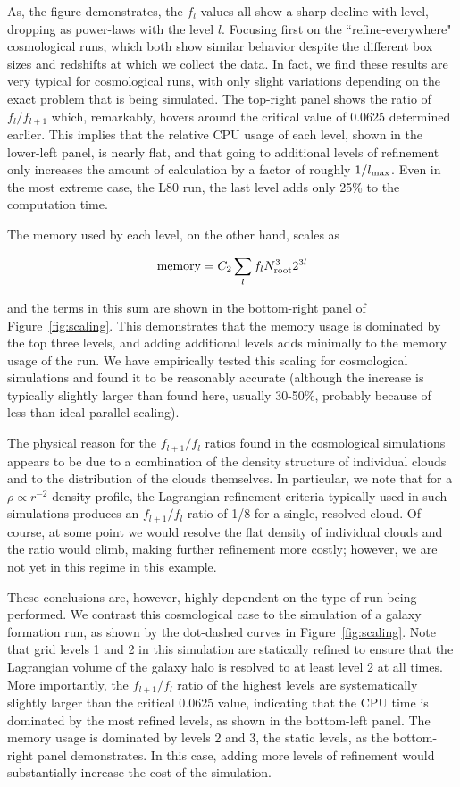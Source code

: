 As, the figure demonstrates, the $f_l$ values all show a sharp decline
with level, dropping as power-laws with the level $l$.  Focusing first
on the ``refine-everywhere" cosmological runs, which both show similar
behavior despite the different box sizes and redshifts at which we
collect the data.  In fact, we find these results are very typical for
cosmological runs, with only slight variations depending on the exact
problem that is being simulated.  The top-right panel shows the ratio
of $f_{l}/f_{l+1}$ which, remarkably, hovers around the critical value
of 0.0625 determined earlier.  This implies that the relative CPU
usage of each level, shown in the lower-left panel, is nearly flat,
and that going to additional levels of refinement only increases the
amount of calculation by a factor of roughly $1/l_{\rm max}$.  Even in
the most extreme case, the L80 run, the last level adds only 25\% to
the computation time.

The memory used by each level, on the other hand, scales as

\begin{equation}
{\rm memory} = C_2 \sum_l f_l N_{\rm root}^3 2^{3l}
\end{equation}

and the terms in this sum are shown in the bottom-right panel of
Figure~\ref{fig:scaling}.  This demonstrates that the memory usage is
dominated by the top three levels, and adding additional levels 
adds minimally to the memory usage of the run.  We have empirically
tested this scaling for cosmological simulations and found it to be
reasonably accurate (although the increase is typically slightly
larger than found here, usually 30-50\%, probably because of
less-than-ideal parallel scaling).

The physical reason for the $f_{l+1}/f_l$ ratios found in the
cosmological simulations appears to be due to a combination of the
density structure of individual clouds and to the distribution of the
clouds themselves.  In particular, we note that for a $\rho \propto
r^{-2}$ density profile, the Lagrangian refinement criteria typically
used in such simulations produces an $f_{l+1}/f_l$ ratio of 1/8 for a
single, resolved cloud.  Of course, at some point we would resolve the
flat density of individual clouds and the ratio would climb, making
further refinement more costly; however, we are not yet in this regime
in this example.

These conclusions are, however, highly dependent on the type of run
being performed.  We contrast this cosmological case to the simulation
of a galaxy formation run, as shown by the dot-dashed curves in
Figure~\ref{fig:scaling}.  Note that grid levels 1 and 2 in this
simulation are statically refined to ensure that the Lagrangian volume
of the galaxy halo is resolved to at least level 2 at all times. More
importantly, the $f_{l+1}/f_{l}$ ratio of the highest levels are
systematically slightly larger than the critical 0.0625 value,
indicating that the CPU time is dominated by the most refined levels,
as shown in the bottom-left panel.  The memory usage is dominated by
levels 2 and 3, the static levels, as the bottom-right panel
demonstrates.  In this case, adding more levels of refinement would
substantially increase the cost of the simulation.

